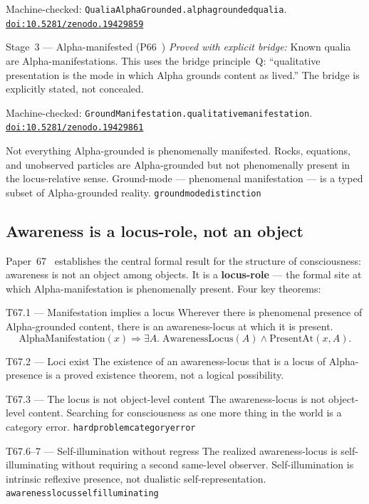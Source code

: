 \documentclass[11pt]{article}
\theoremstyle{remark}
\newcommand{\lean}[1]{%
  \penalty-100
  \begingroup\def\_{\textunderscore\allowbreak}\texttt{#1}\endgroup}
\newcommand{\doi}[1]{\href{https://doi.org/#1}{\nolinkurl{doi:#1}}}
\begin{document}
\begin{termlist}
    Machine-checked: \lean{QualiaAlphaGrounded.alpha\_grounded\_qualia}.\\
    \doi{10.5281/zenodo.19429859}

  \item[Stage~3 --- Alpha-manifested (P66~\cite{SpivackNEMS66})]
    \emph{Proved with explicit bridge:} Known qualia are Alpha-manifestations.
    This uses the bridge principle~Q: ``qualitative presentation is the mode in which
    Alpha grounds content as lived.'' The bridge is explicitly stated, not concealed.

    Machine-checked: \lean{GroundManifestation.qualitative\_manifestation}.
    \doi{10.5281/zenodo.19429861}
\end{termlist}

\medskip
\begin{tcolorbox}[colback=gray!14,colframe=gray!50!black,title={Non-collapse (P66)}]
Not everything Alpha-grounded is phenomenally manifested. Rocks, equations, and
unobserved particles are Alpha-grounded but not phenomenally present in the
locus-relative sense. Ground-mode --- phenomenal manifestation --- is a typed subset
of Alpha-grounded reality.
\lean{ground\_mode\_distinction}
\end{tcolorbox}

\subsection{Awareness is a locus-role, not an object}\label{sec:locus}

Paper~67~\cite{SpivackNEMS67} establishes the central formal result for the structure
of consciousness: awareness is not an object among objects. It is a \textbf{locus-role}
--- the formal site at which Alpha-manifestation is phenomenally present. Four key
theorems:

\medskip
\begin{termlist}
  \item[T67.1 --- Manifestation implies a locus]
    Wherever there is phenomenal presence of Alpha-grounded content, there is an
    awareness-locus at which it is present.
    \[\text{AlphaManifestation}(x) \Rightarrow \exists A.\;
      \text{AwarenessLocus}(A) \wedge \text{PresentAt}(x,A).\]

  \item[T67.2 --- Loci exist]
    The existence of an awareness-locus that is a locus of Alpha-presence is a
    proved existence theorem, not a logical possibility.

  \item[T67.3 --- The locus is not object-level content]
    The awareness-locus is not object-level content. Searching for consciousness
    as one more thing in the world is a category error.
    \lean{hard\_problem\allowbreak\_category\_error}

  \item[T67.6--7 --- Self-illumination without regress]
    The realized awareness-locus is self-illuminating without requiring a second
    same-level observer. Self-illumination is intrinsic reflexive presence, not
    dualistic self-representation.
    \lean{awareness\_locus\allowbreak\_self\_illuminating}
\end{termlist}
\end{document}
